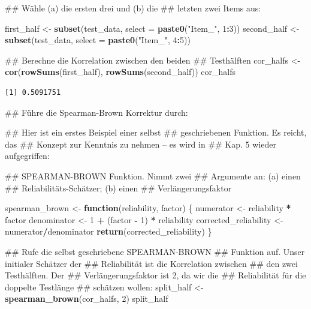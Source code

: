 \documentclass[12pt,]{tufte-book}
\newenvironment{Shaded}{\begin{snugshade}}{\end{snugshade}}
\newcommand{\KeywordTok}[1]{\textcolor[rgb]{0.13,0.29,0.53}{\textbf{#1}}}
\newcommand{\DataTypeTok}[1]{\textcolor[rgb]{0.13,0.29,0.53}{#1}}
\newcommand{\DecValTok}[1]{\textcolor[rgb]{0.00,0.00,0.81}{#1}}
\newcommand{\StringTok}[1]{\textcolor[rgb]{0.31,0.60,0.02}{#1}}
\newcommand{\ControlFlowTok}[1]{\textcolor[rgb]{0.13,0.29,0.53}{\textbf{#1}}}
\newcommand{\OperatorTok}[1]{\textcolor[rgb]{0.81,0.36,0.00}{\textbf{#1}}}
\newcommand{\NormalTok}[1]{#1}
\theoremstyle{definition}
\theoremstyle{definition}
\theoremstyle{definition}
\theoremstyle{remark}
\begin{document}
\begin{Shaded}
\begin{Highlighting}[]
\NormalTok{## Wähle (a) die ersten drei und (b) die}
\NormalTok{## letzten zwei Items aus:}

\NormalTok{first_half <-}\StringTok{ }\KeywordTok{subset}\NormalTok{(test_data, }\DataTypeTok{select =} \KeywordTok{paste0}\NormalTok{(}\StringTok{"Item_"}\NormalTok{, }
    \DecValTok{1}\OperatorTok{:}\DecValTok{3}\NormalTok{))}
\NormalTok{second_half <-}\StringTok{ }\KeywordTok{subset}\NormalTok{(test_data, }\DataTypeTok{select =} \KeywordTok{paste0}\NormalTok{(}\StringTok{"Item_"}\NormalTok{, }
    \DecValTok{4}\OperatorTok{:}\DecValTok{5}\NormalTok{))}

\NormalTok{## Berechne die Korrelation zwischen den beiden}
\NormalTok{## Testhälften}
\NormalTok{cor_halfs <-}\StringTok{ }\KeywordTok{cor}\NormalTok{(}\KeywordTok{rowSums}\NormalTok{(first_half), }\KeywordTok{rowSums}\NormalTok{(second_half))}
\NormalTok{cor_halfs}
\end{Highlighting}
\end{Shaded}

\begin{verbatim}
[1] 0.5091751
\end{verbatim}

\begin{Shaded}
\begin{Highlighting}[]
\NormalTok{## Führe die Spearman-Brown Korrektur durch:}

\NormalTok{## Hier ist ein erstes Beispiel einer selbst}
\NormalTok{## geschriebenen Funktion. Es reicht, das}
\NormalTok{## Konzept zur Kenntnis zu nehmen -- es wird in}
\NormalTok{## Kap. 5 wieder aufgegriffen:}

\NormalTok{## SPEARMAN-BROWN Funktion. Nimmt zwei}
\NormalTok{## Argumente an: (a) einen}
\NormalTok{## Reliabilitäts-Schätzer; (b) einen}
\NormalTok{## Verlängerungsfaktor}

\NormalTok{spearman_brown <-}\StringTok{ }\ControlFlowTok{function}\NormalTok{(reliability, factor) \{}
\NormalTok{    numerator <-}\StringTok{ }\NormalTok{reliability }\OperatorTok{*}\StringTok{ }\NormalTok{factor}
\NormalTok{    denominator <-}\StringTok{ }\DecValTok{1} \OperatorTok{+}\StringTok{ }\NormalTok{(factor }\OperatorTok{-}\StringTok{ }\DecValTok{1}\NormalTok{) }\OperatorTok{*}\StringTok{ }\NormalTok{reliability}
\NormalTok{    corrected_reliability <-}\StringTok{ }\NormalTok{numerator}\OperatorTok{/}\NormalTok{denominator}
    \KeywordTok{return}\NormalTok{(corrected_reliability)}
\NormalTok{\}}

\NormalTok{## Rufe die selbst geschriebene SPEARMAN-BROWN}
\NormalTok{## Funktion auf. Unser initialer Schätzer der}
\NormalTok{## Reliabilität ist die Korrelation zwischen}
\NormalTok{## den zwei Testhälften.  Der}
\NormalTok{## Verlängerungsfaktor ist 2, da wir die}
\NormalTok{## Reliabilität für die doppelte Testlänge}
\NormalTok{## schätzen wollen:}
\NormalTok{split_half <-}\StringTok{ }\KeywordTok{spearman_brown}\NormalTok{(cor_halfs, }\DecValTok{2}\NormalTok{)}
\NormalTok{split_half}
\end{Highlighting}
\end{Shaded}
\end{document}
